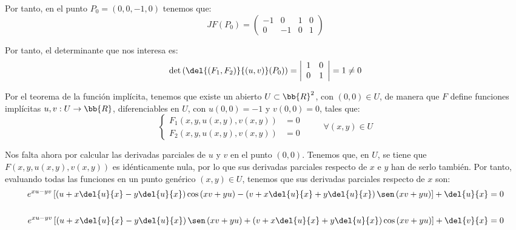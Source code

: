 \begin{ejercicio}
    Por tanto, en el punto $P_0=(0,0,-1,0)$ tenemos que:
    \begin{equation*}
        JF(P_0) = \left(
            \begin{array}{cccc}
                -1 & 0 & 1 & 0 \\
                0 & -1 & 0 & 1
            \end{array}
        \right)
    \end{equation*}

    Por tanto, el determinante que nos interesa es:
    \begin{equation*}
        \det \left( \del{(F_1,F_2)}{(u,v)}(P_0) \right) =
        \left|
            \begin{array}{cc}
                1 & 0 \\
                0 & 1
            \end{array}
        \right| = 1 \neq 0
    \end{equation*}

    Por el teorema de la función implícita, tenemos que existe un abierto $U\subset \bb{R}^2$, con $(0,0)\in U$,
    de manera que $F$ define funciones implícitas $u,v:U\to \bb{R}$, diferenciables en $U$, con $u(0,0)=-1$ y $v(0,0)=0$,
    tales que:
    \begin{equation}
        \left\{
            \begin{array}{ll}
                F_1(x,y,u(x,y),v(x,y)) &= 0 \\
                F_2(x,y,u(x,y),v(x,y)) &= 0
            \end{array}
        \right. \hspace{1cm} \forall (x,y)\in U
    \end{equation}

    Nos falta ahora por calcular las derivadas parciales de $u$ y $v$ en el punto $(0,0)$.
    Tenemos que, en $U$, se tiene que $F(x,y,u(x,y),v(x,y))$ es idénticamente nula, por lo que sus derivadas parciales respecto de $x$ e $y$ han de serlo también.
    Por tanto, evaluando todas las funciones en un punto genérico $(x,y)\in U$, tenemos que sus derivadas parciales respecto de $x$ son:
    \begin{align*}
        e^{xu-yv} \left[\left(u + x\del{u}{x} - y\del{u}{x}\right)\cos \left(xv+yu\right) - \left(v + x\del{u}{x} + y\del{u}{x}\right)\sen \left(xv+yu\right)\right] + \del{u}{x} &= 0 \\ \\
        e^{xu-yv} \left[\left(u + x\del{u}{x} - y\del{u}{x}\right)\sen \left(xv+yu\right) + \left(v + x\del{u}{x} + y\del{u}{x}\right)\cos \left(xv+yu\right)\right] + \del{v}{x} &= 0
    \end{align*}


\end{ejercicio}
